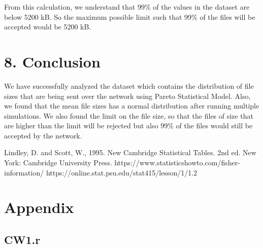 \documentclass[11pt]{article}
\begin{document}
From this calculation, we understand that 99$\%$ of the values in the dataset are below 5200 kB. So the maximum possible limit such that 99$\%$ of the files will be accepted would be 5200 kB.

\section*{8. Conclusion}

We have successfully analyzed the dataset which contains the distribution of file sizes that are being sent over the network using Pareto Statistical Model. Also, we found that the mean file sizes has a normal distribution after running multiple simulations. We also found the limit on the file size, so that the files of size that are higher than the limit will be rejected but also 99$\%$ of the files would still be accepted by the network.\\

\begin{thebibliography}{}
 Lindley, D. and Scott, W., 1995. New Cambridge Statistical Tables. 2nd ed. New York: Cambridge University Press. 
https://www.statisticshowto.com/fisher-information/
https://online.stat.psu.edu/stat415/lesson/1/1.2
\end{thebibliography}

\newpage
\section*{Appendix}
\subsection*{CW1.r}

\end{document}
